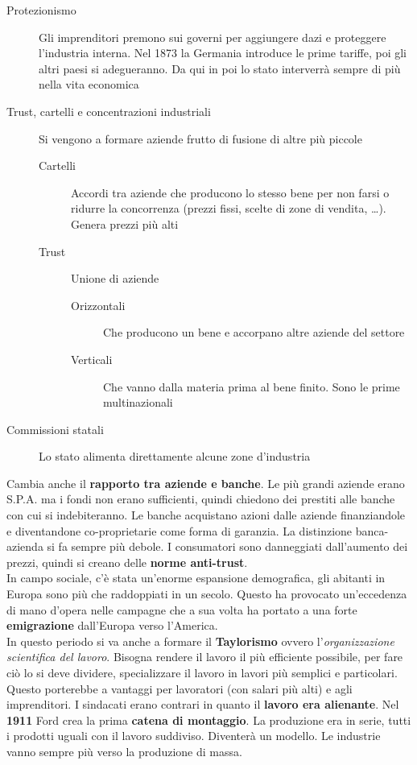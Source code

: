 \begin{description}
  \item[Protezionismo] Gli imprenditori premono sui governi per aggiungere dazi e proteggere 
    l'industria interna. Nel 1873 la Germania introduce le prime tariffe, poi gli altri paesi si
    adegueranno. Da qui in poi lo stato interverrà sempre di più nella vita economica
  \item[Trust, cartelli e concentrazioni industriali] Si vengono a formare aziende frutto di fusione
    di altre più piccole
    \begin{description}
      \item[Cartelli] Accordi tra aziende che producono lo stesso bene per non farsi o ridurre la
        concorrenza (prezzi fissi, scelte di zone di vendita, \ldots). Genera prezzi più alti
      \item[Trust] Unione di aziende
        \begin{description}
          \item[Orizzontali] Che producono un bene e accorpano altre aziende del settore
          \item[Verticali] Che vanno dalla materia prima al bene finito. Sono le prime multinazionali
        \end{description}
    \end{description}
  \item[Commissioni statali] Lo stato alimenta direttamente alcune zone d'industria
\end{description}
Cambia anche il \textbf{rapporto tra aziende e banche}. Le più grandi aziende erano S.P.A. ma i fondi
non erano sufficienti, quindi chiedono dei prestiti alle banche con cui si indebiteranno. Le banche 
acquistano azioni dalle aziende finanziandole e diventandone co-proprietarie come forma di garanzia. 
La distinzione banca-azienda si fa sempre più debole. I consumatori sono danneggiati dall'aumento
dei prezzi, quindi si creano delle \textbf{norme anti-trust}.\\ [\baselineskip]
In campo sociale, c'è stata un'enorme espansione demografica, gli abitanti in Europa sono più che
raddoppiati in un secolo. Questo ha provocato un'eccedenza di mano d'opera nelle campagne che a sua
volta ha portato a una forte \textbf{emigrazione} dall'Europa verso l'America.\\ [\baselineskip]
In questo periodo si va anche a formare il \textbf{Taylorismo} ovvero l'\emph{organizzazione 
scientifica del lavoro}. Bisogna rendere il lavoro il più efficiente possibile, per fare ciò lo
si deve dividere, specializzare il lavoro in lavori più semplici e particolari. Questo porterebbe
a vantaggi per lavoratori (con salari più alti) e agli imprenditori. I sindacati erano contrari in
quanto il \textbf{lavoro era alienante}. Nel \textbf{1911} Ford crea la prima \textbf{catena di
montaggio}. La produzione era in serie, tutti i prodotti uguali con il lavoro suddiviso. Diventerà
un modello. Le industrie vanno sempre più verso la produzione di massa.
